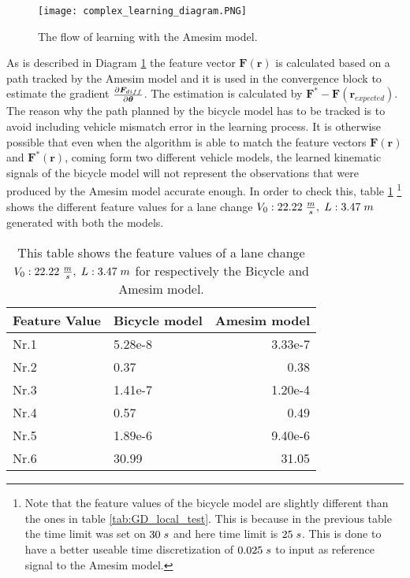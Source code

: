 \begin{figure}[h!]
	\centering
	\texttt{[image: complex\_learning\_diagram.PNG]}
	\caption{The flow of learning with the Amesim model.}	
	\label{fig:complex_learning} 
\end{figure}

As is described in Diagram \ref{fig:complex_learning} the feature vector $\bm{F}(\bm{r})$ is calculated based on a path tracked by the Amesim model and it is used in the convergence block to estimate the gradient $\pdv{\bm{F}_{diff}}{\bm{\theta}}$. The estimation is calculated by $\bm{F}^* - \bm{F}(\bm{r}_{expected})$. The reason why the path planned by the bicycle model has to be tracked is to avoid including vehicle mismatch error in the learning process. It is otherwise possible that even when the algorithm is able to match the feature vectors $\bm{F}(\bm{r})$ and  $\bm{F}^*(\bm{r})$, coming form two different vehicle models, the learned kinematic signals of the bicycle model will not represent the observations that were produced by the Amesim model accurate enough. In order to check this, table \ref{tab:comparinson_models} \footnote{Note that the feature values of the bicycle model are slightly different than the ones in table \ref{tab:GD_local_test}. This is because in the previous table the time limit was set on $30 \hspace{1mm}s$ and here time limit is $25 \hspace{1mm}s$. This is done to have a better useable time discretization of $0.025\hspace{1mm}s$ to input as reference signal to the Amesim model.} shows the different feature values for a lane change $V_0:22.22\hspace{1mm}\frac{m}{s},\hspace{1mm} L:3.47\hspace{1mm}m$ generated with both the models.\\


\begin{table}[h!]
	\centering
	\begin{tabular}{@{}llr@{}} \toprule
		\textbf{Feature Value}    & Bicycle model & Amesim model\\ \midrule
		Nr.1       		 & 5.28e-8    & 3.33e-7 \\
		Nr.2       		 & 0.37       & 0.38  \\
		Nr.3       		 & 1.41e-7    & 1.20e-4 \\
		Nr.4       		 & 0.57       & 0.49  \\
		Nr.5       		 & 1.89e-6    & 9.40e-6 \\
		Nr.6       		 & 30.99      & 31.05\\ \bottomrule
	\end{tabular}
	\caption{This table shows the feature values of a lane change $V_0:22.22\hspace{1mm}\frac{m}{s},\hspace{1mm} L:3.47\hspace{1mm}m$ for respectively the Bicycle and Amesim model.}
	\label{tab:comparinson_models}
\end{table}

